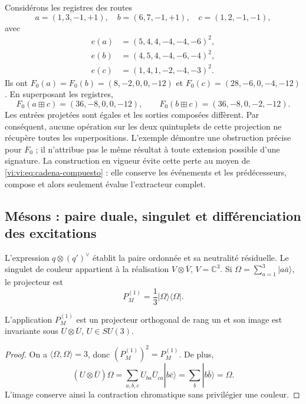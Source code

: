 Considérons les registres des routes
\[
 a=(1,3,-1,+1),\quad b=(6,7,-1,+1),\quad c=(1,2,-1,-1),
\]
avec
\begin{align*}
 e(a)&=(5,4,4,-4,-4,-6)^2,\\
 e(b)&=(4,5,4,-4,-6,-4)^2,\\
 e(c)&=(1,4,1,-2,-4,-3)^2.
\end{align*}
Ils ont \(F_0(a)=F_0(b)=(8,-2,0,0,-12)\) et
\(F_0(c)=(28,-6,0,-4,-12)\). En superposant les registres,
\[
 F_0(a\boxplus c)=(36,-8,0,0,-12),\qquad
 F_0(b\boxplus c)=(36,-8,0,-2,-12).
\]
Les entrées projetées sont égales et les sorties composées diffèrent.
Par conséquent, aucune opération sur les deux quintuplets de cette
projection ne récupère toutes les superpositions. L’exemple démontre une
obstruction précise pour \(F_0\) ; il n’attribue pas le même résultat à toute
extension possible d’une signature. La construction en vigueur évite cette
perte au moyen de \eqref{vi:vi:eq:cadena-compuesto} : elle conserve les événements
et les prédécesseurs, compose et alors seulement évalue l’extracteur complet.

\subsection{Mésons : paire duale, singulet et différenciation des excitations}
\label{vi:vi:subsec:mesones-familias}

L’expression \(q\otimes(q')^\vee\) établit la paire ordonnée et sa
neutralité résiduelle. Le singulet de couleur appartient à la réalisation
\(V\otimes\overline V\), \(V=\mathbb C^3\). Si
\(\Omega=\sum_{a=1}^3|a\bar a\rangle\), le projecteur est
\begin{equation}
 P_M^{(1)}=\frac13|\Omega\rangle\langle\Omega|.
 \label{vi:vi:eq:singlete-meson}
\end{equation}

\begin{proposition}
L’application \(P_M^{(1)}\) est un projecteur orthogonal de rang un et
son image est invariante sous \(U\otimes\overline U\), \(U\in SU(3)\).
\end{proposition}
\begin{proof}
On a \(\langle\Omega,\Omega\rangle=3\), donc
\((P_M^{(1)})^2=P_M^{(1)}\). De plus,
\[
 (U\otimes\overline U)\Omega
 =\sum_{a,b,c}U_{ba}\overline U_{ca}|b\bar c\rangle
 =\sum_b|b\bar b\rangle=\Omega.
\]
L’image conserve ainsi la contraction chromatique sans privilégier une couleur.
\end{proof}

